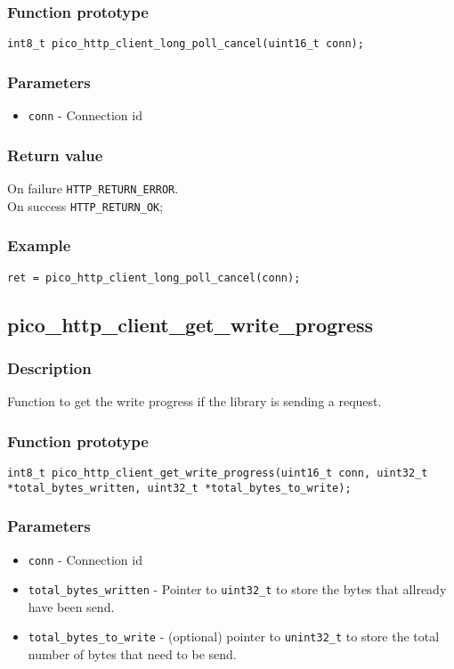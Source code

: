 \subsubsection*{Function prototype}
\texttt{int8\_t pico\_http\_client\_long\_poll\_cancel(uint16\_t conn);}

\subsubsection*{Parameters}
\begin{itemize}[noitemsep]
\item \texttt{conn} - Connection id
\end{itemize}
\subsubsection*{Return value}
On failure \texttt{HTTP\_RETURN\_ERROR}.
\\On success \texttt{HTTP\_RETURN\_OK};
\subsubsection*{Example}
\begin{verbatim}
ret = pico_http_client_long_poll_cancel(conn);
\end{verbatim}


\subsection{pico\_http\_client\_get\_write\_progress}

\subsubsection*{Description}
Function to get the write progress if the library is sending a request.

\subsubsection*{Function prototype}
\texttt{int8\_t pico\_http\_client\_get\_write\_progress(uint16\_t conn, uint32\_t *total\_bytes\_written, uint32\_t *total\_bytes\_to\_write);}

\subsubsection*{Parameters}
\begin{itemize}[noitemsep]
\item \texttt{conn} - Connection id
\item \texttt{total\_bytes\_written} - Pointer to \texttt{uint32\_t} to store the bytes that allready have been send.
\item \texttt{total\_bytes\_to\_write} - (optional) pointer to  \texttt{unint32\_t} to store the total number of bytes that need to be send.
\end{itemize}
